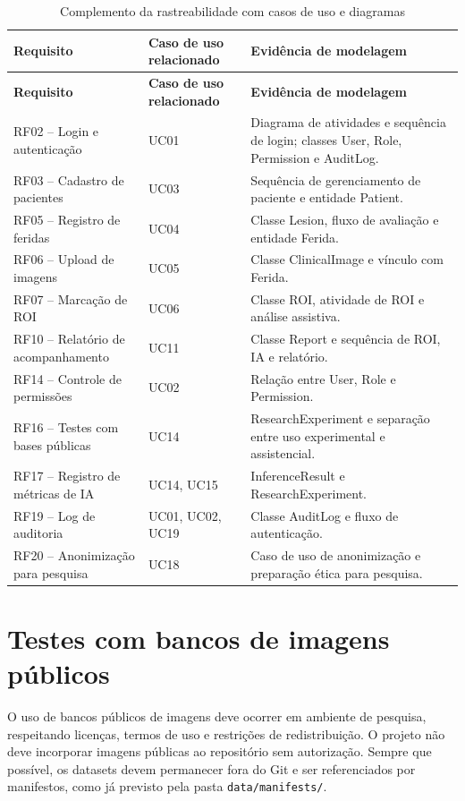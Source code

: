\documentclass[
    12pt,
    oneside,
    a4paper,
    chapter=TITLE,
    brazil,
    sumario=tradicional,
    hidelinks
]{abntex2}
\begin{document}
\begin{longtable}{L{4.0cm}L{3.3cm}L{5.7cm}}
\caption{\label{tab:rastreabilidade-casos-uso}Complemento da rastreabilidade com casos de uso e diagramas}\\
\toprule
\textbf{Requisito} & \textbf{Caso de uso relacionado} & \textbf{Evidência de modelagem} \\
\midrule
\endfirsthead
\toprule
\textbf{Requisito} & \textbf{Caso de uso relacionado} & \textbf{Evidência de modelagem} \\
\midrule
\endhead
RF02 -- Login e autenticação & UC01 & Diagrama de atividades e sequência de login; classes User, Role, Permission e AuditLog. \\
RF03 -- Cadastro de pacientes & UC03 & Sequência de gerenciamento de paciente e entidade Patient. \\
RF05 -- Registro de feridas & UC04 & Classe Lesion, fluxo de avaliação e entidade Ferida. \\
RF06 -- Upload de imagens & UC05 & Classe ClinicalImage e vínculo com Ferida. \\
RF07 -- Marcação de ROI & UC06 & Classe ROI, atividade de ROI e análise assistiva. \\
RF10 -- Relatório de acompanhamento & UC11 & Classe Report e sequência de ROI, IA e relatório. \\
RF14 -- Controle de permissões & UC02 & Relação entre User, Role e Permission. \\
RF16 -- Testes com bases públicas & UC14 & ResearchExperiment e separação entre uso experimental e assistencial. \\
RF17 -- Registro de métricas de IA & UC14, UC15 & InferenceResult e ResearchExperiment. \\
RF19 -- Log de auditoria & UC01, UC02, UC19 & Classe AuditLog e fluxo de autenticação. \\
RF20 -- Anonimização para pesquisa & UC18 & Caso de uso de anonimização e preparação ética para pesquisa. \\
\bottomrule
\end{longtable}

\chapter{Testes com bancos de imagens públicos}

O uso de bancos públicos de imagens deve ocorrer em ambiente de pesquisa, respeitando licenças, termos de uso e restrições de redistribuição. O projeto não deve incorporar imagens públicas ao repositório sem autorização. Sempre que possível, os datasets devem permanecer fora do Git e ser referenciados por manifestos, como já previsto pela pasta \texttt{data/manifests/}.
\end{document}
